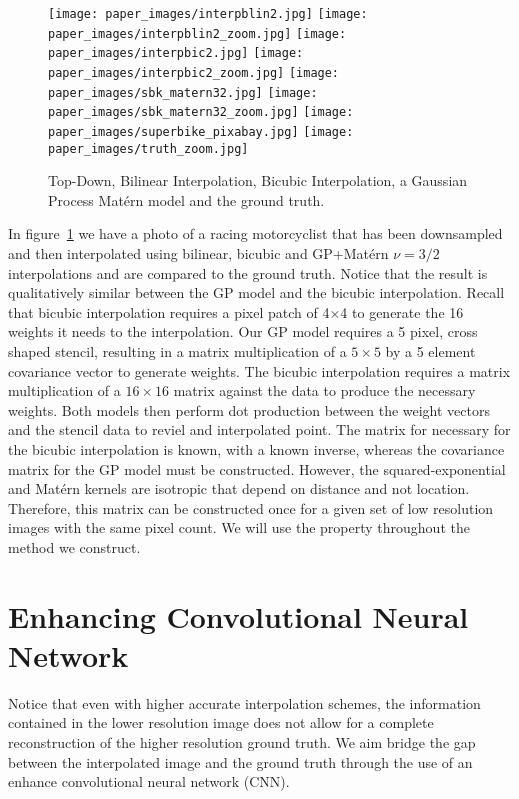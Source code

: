 \documentclass{article}%
\begin{document}
\begin{figure}
\begin{center}
\texttt{[image: paper\_images/interpblin2.jpg]}
\texttt{[image: paper\_images/interpblin2\_zoom.jpg]}  
\texttt{[image: paper\_images/interpbic2.jpg]}
\texttt{[image: paper\_images/interpbic2\_zoom.jpg]}  
\texttt{[image: paper\_images/sbk\_matern32.jpg]}
\texttt{[image: paper\_images/sbk\_matern32\_zoom.jpg]}  
\texttt{[image: paper\_images/superbike\_pixabay.jpg]}
\texttt{[image: paper\_images/truth\_zoom.jpg]}
\caption{\label{fig:gp} Top-Down, Bilinear Interpolation, Bicubic Interpolation, a Gaussian Process Mat\'{e}rn model and 
the ground truth.}
\end{center} 
\end{figure}

In figure~\ref{fig:gp} we have a photo of a racing motorcyclist that has been downsampled and then interpolated 
using bilinear, bicubic and GP+Mat\'{e}rn $\nu = 3/2$ interpolations and are compared to the ground truth. Notice that the 
result is qualitatively similar between the GP model and the bicubic interpolation. Recall that bicubic interpolation requires
a pixel patch of 4$\times$4 to generate the 16 weights it needs to the interpolation. Our GP model requires a 5 pixel, cross 
shaped stencil, resulting in a matrix multiplication of a $5\times5$ by a 5 element covariance vector to generate weights. 
The bicubic interpolation requires a matrix multiplication of a $16\times 16$ matrix against the data to produce the necessary
weights. Both models then perform dot production between the weight vectors and the stencil data to reviel and interpolated 
point. The matrix for necessary for the bicubic interpolation is known, with a known inverse, whereas the covariance matrix 
for the GP model must be constructed. However, the squared-exponential and Mat\'{e}rn kernels are isotropic that depend on 
distance and not location. Therefore, this matrix can be constructed once for a given set of low resolution images with the 
same pixel count. We will use the property throughout the method we construct.  


\section{Enhancing Convolutional Neural Network} 

Notice that even with higher accurate interpolation schemes, the information 
contained in the lower resolution image does not allow for a complete reconstruction of the higher resolution 
ground truth. We aim bridge the gap between the interpolated image and the ground truth through the use of an 
enhance convolutional neural network (CNN). 
\end{document}

